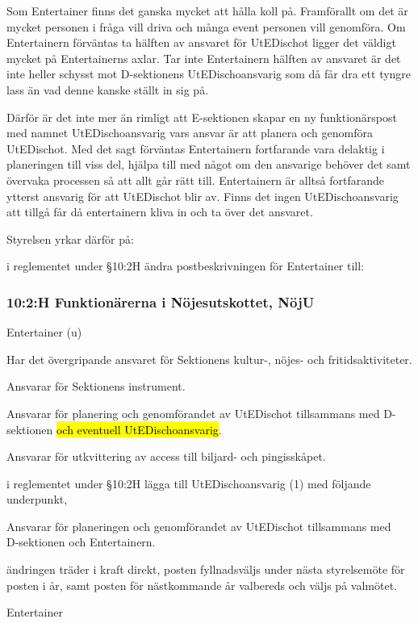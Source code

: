\documentclass[../_main/handlingar.tex]{subfiles}
\begin{document}


Som Entertainer finns det ganska mycket att hålla koll på. Framförallt om det är mycket personen i fråga vill driva och många event personen vill genomföra. Om Entertainern förväntas ta hälften av ansvaret för UtEDischot ligger det väldigt mycket på Entertainerns axlar. Tar inte Entertainern hälften av ansvaret är det inte heller schysst mot D-sektionens UtEDischoansvarig som då får dra ett tyngre lass än vad denne kanske ställt in sig på. 

Därför är det inte mer än rimligt att E-sektionen skapar en ny funktionärspost med namnet UtEDischoansvarig vars ansvar är att planera och genomföra UtEDischot. Med det sagt förväntas Entertainern fortfarande vara delaktig i planeringen till viss del, hjälpa till med något om den ansvarige behöver det samt övervaka processen så att allt går rätt till. Entertainern är alltså fortfarande ytterst ansvarig för att UtEDischot blir av. Finns det ingen UtEDischoansvarig att tillgå får då entertainern kliva in och ta över det ansvaret. 

Styrelsen yrkar därför på: 

\begin{attsatser}
    \att i reglementet under \S10:2H ändra postbeskrivningen för Entertainer till:
    \subsubsection*{10:2:H Funktionärerna i Nöjesutskottet, NöjU}

    \begin{emptylist}
    \item Entertainer (u)
        \begin{dashlist}
          \item Har det övergripande ansvaret för Sektionens kultur-, nöjes- och fritidsaktiviteter.
          \item Ansvarar för Sektionens instrument.
          \item Ansvarar för planering och genomförandet av UtEDischot tillsammans med D-sektionen \hl{och eventuell UtEDischoansvarig}.
          \item Ansvarar för utkvittering av access till biljard- och pingisskåpet.
        \end{dashlist}
        \end{emptylist}
        \changenote
    \att i reglementet under \S10:2H lägga till UtEDischoansvarig (1) med följande underpunkt,
    \begin{itemizedash}
        \item Ansvarar för planeringen och genomförandet av UtEDischot tillsammans med \\D-sektionen och Entertainern.
    \end{itemizedash}
    \att ändringen träder i kraft direkt,
    \att posten fyllnadsväljs under nästa styrelsemöte för posten i år, samt
    \att posten för nästkommande år valbereds och väljs på valmötet. 

\end{attsatser}

\begin{signatures}{1}
    \ist
    \signature{Adam Belfrage}{Entertainer}
\end{signatures}
\end{document}
